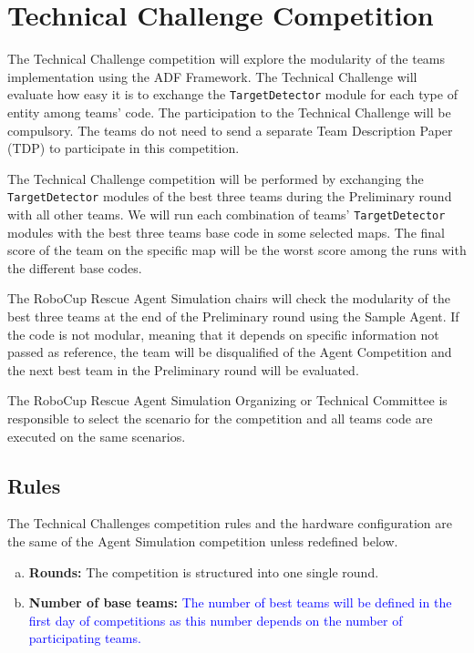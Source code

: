 \documentclass{article}
\begin{document}
\section{Technical Challenge Competition}
\label{sec:technical}
The Technical Challenge competition will explore the modularity of the teams implementation using the ADF Framework. The Technical Challenge will evaluate how easy it is to exchange the \texttt{TargetDetector} module for each type of entity among teams' code. The participation to the Technical Challenge will be compulsory. The teams do not need to send a separate Team Description Paper (TDP) to participate in this competition.

The Technical Challenge competition will be performed by exchanging the \texttt{TargetDetector} modules of the best three teams during the Preliminary round with all other teams. We will run each combination of teams' \texttt{TargetDetector} modules with the best three teams base code in some selected maps. The final score of the team on the specific map will be the worst score among the runs with the different base codes.

The RoboCup Rescue Agent Simulation chairs will check the modularity of the best three teams at the end of the Preliminary round using the Sample Agent. If the code is not modular, meaning that it depends on specific information not passed as reference, the team will be disqualified of the Agent Competition and the next best team in the Preliminary round will be evaluated.

The RoboCup Rescue Agent Simulation Organizing or Technical Committee is responsible to select the scenario for the competition and all teams code are executed on the same scenarios.
\subsection{Rules}
The Technical Challenges competition rules and the hardware configuration are the same of the Agent Simulation competition unless redefined below.
\begin{enumerate}[(a)]
\item \textbf{Rounds:} The competition is structured into one single round.
\item \textbf{Number of base teams:} \textcolor{blue}{The number of best teams will be defined in the first day of competitions as this number depends on the number of participating teams.}
\end{enumerate}
\end{document}

